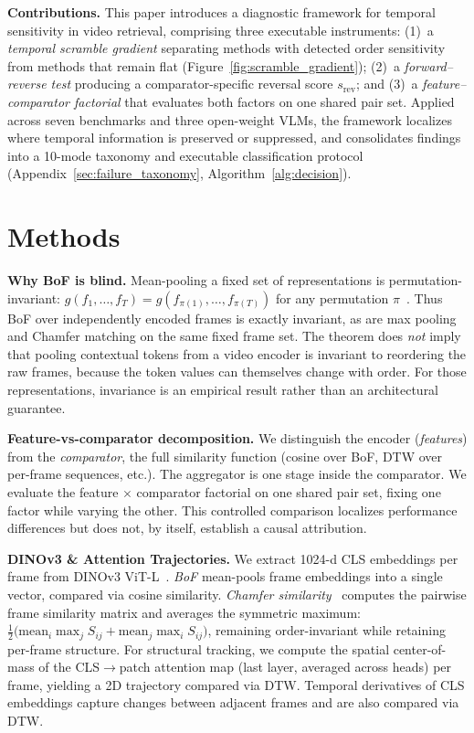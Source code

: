 \documentclass{article}
\theoremstyle{remark}
\begin{document}
\textbf{Contributions.} This paper introduces a diagnostic framework for temporal sensitivity in video retrieval, comprising three executable instruments: (1)~a \emph{temporal scramble gradient} separating methods with detected order sensitivity from methods that remain flat (Figure~\ref{fig:scramble_gradient}); (2)~a \emph{forward--reverse test} producing a comparator-specific reversal score $s_\text{rev}$; and (3)~a \emph{feature--comparator factorial} that evaluates both factors on one shared pair set. Applied across seven benchmarks and three open-weight VLMs, the framework localizes where temporal information is preserved or suppressed, and consolidates findings into a 10-mode taxonomy and executable classification protocol (Appendix~\ref{sec:failure_taxonomy}, Algorithm~\ref{alg:decision}).

\section{Methods}
\label{sec:methods}

\textbf{Why BoF is blind.}
Mean-pooling a fixed set of representations is permutation-invariant: $g(f_1, \ldots, f_T) = g(f_{\pi(1)}, \ldots, f_{\pi(T)})$ for any permutation $\pi$~\cite{deepsets}. Thus BoF over independently encoded frames is exactly invariant, as are max pooling and Chamfer matching on the same fixed frame set. The theorem does \emph{not} imply that pooling contextual tokens from a video encoder is invariant to reordering the raw frames, because the token values can themselves change with order. For those representations, invariance is an empirical result rather than an architectural guarantee.

\textbf{Feature-vs-comparator decomposition.}
We distinguish the encoder (\emph{features}) from the \emph{comparator}, the full similarity function (cosine over BoF, DTW over per-frame sequences, etc.). The aggregator is one stage inside the comparator. We evaluate the feature $\times$ comparator factorial on one shared pair set, fixing one factor while varying the other. This controlled comparison localizes performance differences but does not, by itself, establish a causal attribution.

\textbf{DINOv3 \& Attention Trajectories.} We extract 1024-d CLS embeddings per frame from DINOv3 ViT-L~\cite{dinov3}. \emph{BoF} mean-pools frame embeddings into a single vector, compared via cosine similarity. \emph{Chamfer similarity}~\cite{kordopatis2019visil} computes the pairwise frame similarity matrix and averages the symmetric maximum: $\frac{1}{2}\bigl(\mathrm{mean}_i \max_j S_{ij} + \mathrm{mean}_j \max_i S_{ij}\bigr)$, remaining order-invariant while retaining per-frame structure. For structural tracking, we compute the spatial center-of-mass of the CLS$\to$patch attention map (last layer, averaged across heads) per frame, yielding a 2D trajectory compared via DTW. Temporal derivatives of CLS embeddings capture changes between adjacent frames and are also compared via DTW.
\end{document}
